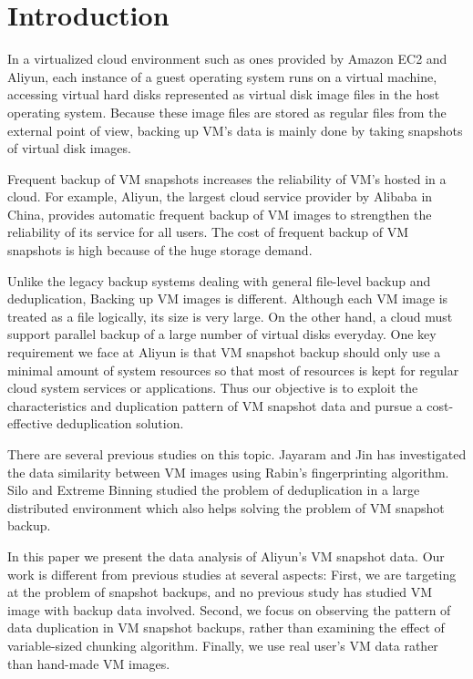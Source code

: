 \section{Introduction}
In a virtualized cloud environment such as ones provided by Amazon EC2 and Aliyun,
each instance of a guest operating system runs on a virtual machine, accessing
virtual hard disks represented as virtual disk image files in the host operating system.
Because these image files are stored as regular files from the external point of view,
backing up VM's data is mainly done by taking snapshots of virtual disk images.

Frequent  backup of VM snapshots increases  the reliability of VM's hosted in a cloud.
For example, Aliyun, the largest cloud service provider by Alibaba in China, 
provides automatic frequent backup of VM images to strengthen the reliability of its service for all users.
The cost of frequent backup of VM snapshots is  high because of the huge storage demand.

Unlike the legacy backup systems\cite{jumbo07} dealing with general file-level backup and deduplication, 
Backing up VM images is different. Although each VM image is treated as a file logically, its size is very large.
On the other hand, a cloud must support parallel backup of a large number of virtual disks everyday. 
One key requirement we face at Aliyun is that VM snapshot backup should only use a minimal amount of system
resources so that most of resources is kept for regular cloud system services or applications.
Thus our objective is to exploit the characteristics and duplication pattern of VM snapshot data and
pursue a cost-effective deduplication solution. 

There are several previous studies on this topic. Jayaram\cite{Jayaram2011} and
Jin\cite{Jin2009} has investigated the data similarity between VM images using 
Rabin's fingerprinting\cite{identify00} algorithm. 
Silo\cite{xia2011} and Extreme Binning\cite{extreme_binning09} studied the problem
of deduplication in a large distributed environment which also helps solving the
problem of VM snapshot backup.

In this paper we present the data analysis of Aliyun's VM snapshot data.
Our work is different from previous studies at several aspects:
First, we are targeting at the problem of snapshot backups, 
and no previous study has studied VM image with backup data involved.
Second, we focus on observing the pattern of data duplication in VM snapshot backups,
rather than examining the effect of variable-sized chunking algorithm.
Finally, we use real user's VM data rather than hand-made VM images.


